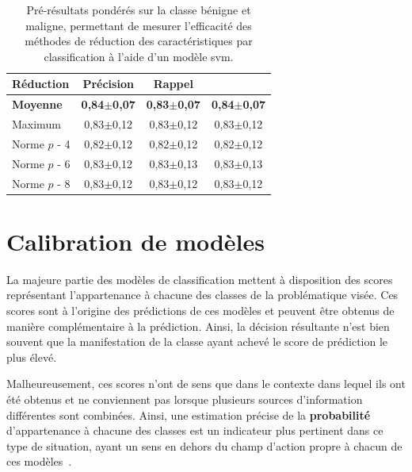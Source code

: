 \begin{table}[H]
    \centering
    \begin{tabular}{lccc} \toprule
        Réduction           & Précision             & Rappel                & \Fscore{}             \\ \midrule
        \textbf{Moyenne}    & \textbf{0,84$\pm$0,07}& \textbf{0,83$\pm$0,07}& \textbf{0,84$\pm$0,07}\\
        Maximum             & 0,83$\pm$0,12         & 0,83$\pm$0,12         & 0,83$\pm$0,12         \\
        Norme $p$ - 4       & 0,82$\pm$0,12         & 0,82$\pm$0,12         & 0,82$\pm$0,12         \\
        Norme $p$ - 6       & 0,83$\pm$0,12         & 0,83$\pm$0,13         & 0,83$\pm$0,13         \\
        Norme $p$ - 8       & 0,83$\pm$0,12         & 0,83$\pm$0,12         & 0,83$\pm$0,12         \\ \bottomrule
    \end{tabular}
    \caption{Pré-résultats pondérés sur la classe bénigne et maligne, permettant de mesurer l'efficacité des méthodes de réduction des caractéristiques par classification à l'aide d'un modèle \gls{svm}.}
    \label{tab:results_multimodality_weighted_microscopy}
\end{table}

\clearpage

\section{Calibration de modèles}
\label{sec:calibrate_models}
La majeure partie des modèles de classification mettent à disposition des scores représentant l'appartenance à chacune des classes de la problématique visée. Ces scores sont à l'origine des prédictions de ces modèles et peuvent être obtenus de manière complémentaire à la prédiction. Ainsi, la décision résultante n'est bien souvent que la manifestation de la classe ayant achevé le score de prédiction le plus élevé.\par

Malheureusement, ces scores n'ont de sens que dans le contexte dans lequel ils ont été obtenus et ne conviennent pas lorsque plusieurs sources d'information différentes sont combinées. Ainsi, une estimation précise de la \textbf{probabilité} d'appartenance à chacune des classes est un indicateur plus pertinent dans ce type de situation, ayant un sens en dehors du champ d'action propre à chacun de ces modèles~\cite{Zadrozny2002}.\par

